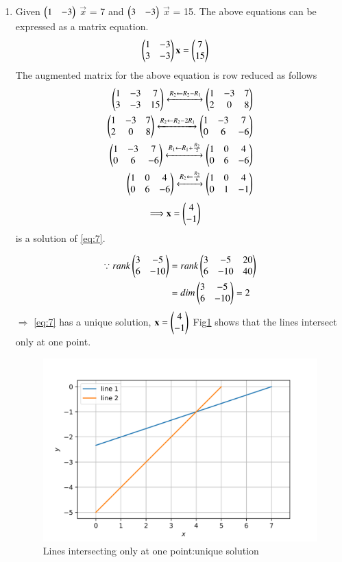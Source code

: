 \documentclass[journal,12pt,twocolumn]{IEEEtran}
\begin{document}
\begin{enumerate}
    \item Given $\begin{pmatrix}1&-3\end{pmatrix}$ $\vec{x}$ = 7 and $\begin{pmatrix}3&-3\end{pmatrix}$ $\vec{x}$ = 15.
    The above equations can be expressed as a matrix equation.
    \begin{align}
\label{eq:7}
  \begin{pmatrix}1&-3\\3&-3\end{pmatrix}\mathbf{x} &= \begin{pmatrix}7\\15\end{pmatrix}
\end{align}
The augmented matrix for the above equation
is row reduced as follows
\begin{align}
    \begin{pmatrix}1&-3&7\\3&-3&15\end{pmatrix}\xleftrightarrow{R_2\leftarrow R_2 -R_1}\begin{pmatrix}1&-3&7\\2&0&8\end{pmatrix} 
    \\ 
    \begin{pmatrix}1&-3&7\\2&0&8\end{pmatrix}\xleftrightarrow{R_2\leftarrow R_2 -2R_1}\begin{pmatrix}1&-3&7\\0&6&-6\end{pmatrix} 
    \\
    \begin{pmatrix}1&-3&7\\0&6&-6\end{pmatrix}\xleftrightarrow{R_1\leftarrow R_1 +\frac{R_2}{2}}\begin{pmatrix}1&0&4\\0&6&-6\end{pmatrix} 
\\ \begin{pmatrix}1&0&4\\0&6&-6\end{pmatrix}\xleftrightarrow{R_2\leftarrow\frac{R_2}{6}}\begin{pmatrix}1&0&4\\0&1&-1\end{pmatrix} \label{eq:11}\end{align} 
\begin{align}
 \Longrightarrow \mathbf{x}&=\begin{pmatrix}4\\-1\end{pmatrix}
\end{align} is a solution of \ref{eq:7}.

\begin{align}
    \because rank \begin{pmatrix}3&-5\\6&-10\end{pmatrix} &= rank\begin{pmatrix}3&-5&20\\6&-10&40\end{pmatrix}\\
    &=dim\begin{pmatrix}3&-5\\6&-10\end{pmatrix}=2
\end{align}
$\Longrightarrow$ \ref{eq:7} has a unique solution, $\mathbf{x}=\begin{pmatrix}4\\-1\end{pmatrix}$
Fig\ref{fig:2} shows that the lines intersect only at one point.

\begin{figure}[H]
    \includegraphics[width= \columnwidth]{assignment2d-1.png}
    \caption{Lines intersecting only at one point:unique solution}
    \label{fig:2}
\end{figure}
\end{enumerate}
\end{document}
